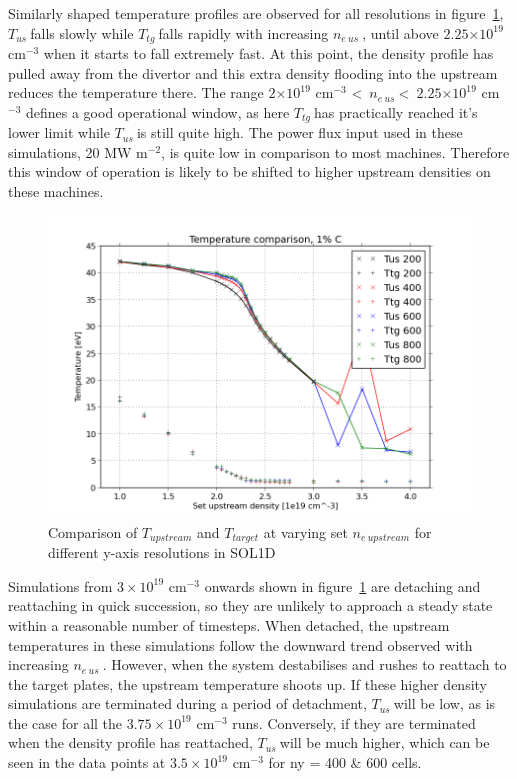 \documentclass[12pt]{article}  %
\providecommand{\e}[1]{\ensuremath{\times 10^{#1}}} %
\providecommand{\noNe}[1]{{${#1}\times 10^{19}$ cm$^{-3}$}} %
\providecommand{\pow}[1]{{$^{#1}$}} %
\providecommand{\neus}{$n_{e~us}~$} %
\providecommand{\Tus}{$T_{us}~$} %
\providecommand{\Ttg}{$T_{tg}~$} %
\begin{document}
Similarly shaped temperature profiles are observed for all resolutions in figure~\ref{figTT_IMPCOMBO2}, \Tus falls slowly while \Ttg falls rapidly with increasing \neus, until above $2.25\e{19}$ cm$^{-3}$ when it starts to fall extremely fast. At this point, the density profile has pulled away from the divertor and this extra density flooding into the upstream reduces the temperature there. The range $2\e{19}$ cm$^{-3}$ \textless~\neus \textless~$2.25\e{19}$ cm$^{-3}$ defines a good operational window, as here \Ttg has practically reached it's lower limit while \Tus is still quite high. The power flux input used in these simulations, 20 MW m\pow{-2}, is quite low in comparison to most machines. Therefore this window of operation is likely to be shifted to higher upstream densities on these machines.

\begin{figure}
\includegraphics[scale=0.5]{Figures/sol1d/TT_IMPCOMBO2.png}
\centering
\caption{Comparison of $T_{upstream}$ and $T_{target}$ at varying set $n_{e~upstream}$ for different y-axis resolutions in SOL1D}\label{figTT_IMPCOMBO2}
\end{figure}

Simulations from \noNe{3} onwards shown in figure~\ref{figTT_IMPCOMBO2} are detaching and reattaching in quick succession, so they are unlikely to approach a steady state within a reasonable number of timesteps. When detached, the upstream temperatures in these simulations follow the downward trend observed with increasing \neus. However, when the system destabilises and rushes to reattach to the target plates, the upstream temperature shoots up. If these higher density simulations are terminated during a period of detachment, \Tus will be low, as is the case for all the \noNe{3.75} runs. Conversely, if they are terminated when the density profile has reattached, \Tus will be much higher, which can be seen in the data points at \noNe{3.5} for ny = 400 \& 600 cells. 
\end{document}
